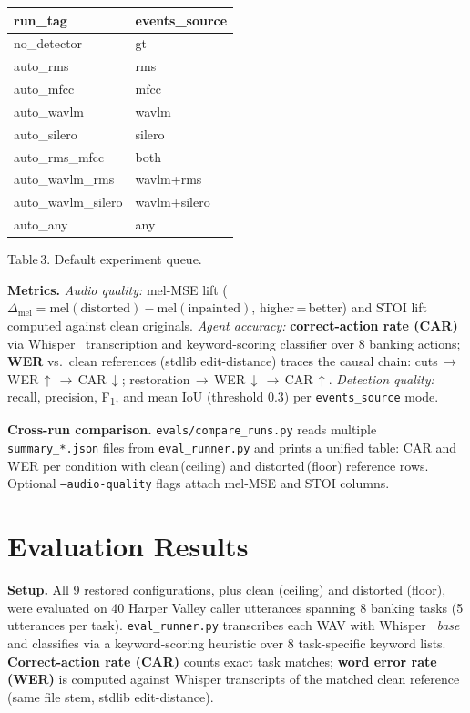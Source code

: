 \documentclass[9pt,twocolumn]{article}
\begin{document}
{\footnotesize\setlength{\tabcolsep}{3pt}
\begin{tabularx}{\columnwidth}{lX}
\toprule
\textbf{run\_tag} & \textbf{events\_source} \\
\midrule
no\_detector       & gt \\
auto\_rms          & rms \\
auto\_mfcc         & mfcc \\
auto\_wavlm        & wavlm \\
auto\_silero       & silero \\
auto\_rms\_mfcc    & both \\
auto\_wavlm\_rms   & wavlm+rms \\
auto\_wavlm\_silero & wavlm+silero \\
auto\_any          & any \\
\bottomrule
\end{tabularx}
}
\vspace{1pt}
{\tiny Table\,3. Default experiment queue.}

\noindent\textbf{Metrics.}
\textit{Audio quality:} mel-MSE lift ($\Delta_\mathrm{mel} =
\mathrm{mel}(\mathrm{distorted}) - \mathrm{mel}(\mathrm{inpainted})$,
higher\,=\,better) and STOI lift computed against clean originals.
\textit{Agent accuracy:} \textbf{correct-action rate (CAR)} via
Whisper~\cite{whisper} transcription and keyword-scoring classifier over
8 banking actions; \textbf{WER} vs.\ clean references (stdlib
edit-distance) traces the causal chain:
cuts\,$\to$\,WER\,$\uparrow$\,$\to$\,CAR\,$\downarrow$;
restoration\,$\to$\,WER\,$\downarrow$\,$\to$\,CAR\,$\uparrow$.
\textit{Detection quality:} recall, precision, F\textsubscript{1},
and mean IoU (threshold 0.3) per \texttt{events\_source} mode.

\noindent\textbf{Cross-run comparison.}
\texttt{evals/compare\_runs.py} reads multiple \texttt{summary\_*.json}
files from \texttt{eval\_runner.py} and prints a unified table:
CAR and WER per condition with clean\,(ceiling) and
distorted\,(floor) reference rows.  Optional
\texttt{--audio-quality} flags attach mel-MSE and STOI columns.

\section{Evaluation Results}
\label{sec:results}

\noindent\textbf{Setup.}
All 9 restored configurations, plus clean (ceiling) and distorted (floor),
were evaluated on 40 Harper Valley caller utterances spanning 8 banking tasks
(5 utterances per task).
\texttt{eval\_runner.py} transcribes each WAV with Whisper~\cite{whisper}
\textit{base} and classifies via a keyword-scoring heuristic over
8 task-specific keyword lists.
\textbf{Correct-action rate (CAR)} counts exact task matches;
\textbf{word error rate (WER)} is computed
against Whisper transcripts of the matched clean reference
(same file stem, stdlib edit-distance).
\end{document}
